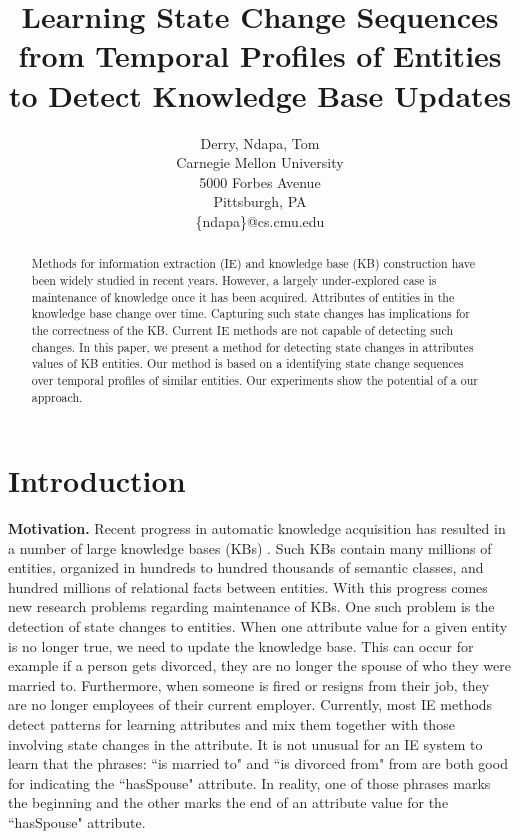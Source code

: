 \documentclass[11pt,a4paper]{article}
\title{Learning State Change Sequences from Temporal Profiles of Entities to Detect Knowledge Base Updates}
\author{Derry, Ndapa, Tom\\
Carnegie Mellon University\\ 5000 Forbes Avenue\\Pittsburgh, PA\\
  { \small
    \{ndapa\}@cs.cmu.edu}
}
\author{
}
\renewcommand{\paragraph}[1]{\noindent\textbf{#1.}}
\begin{document}
\maketitle


\begin{abstract}
 Methods for information extraction (IE) and knowledge base (KB)
construction have been widely studied in recent years.  However, a largely
under-explored case is  maintenance of  knowledge once it has been acquired. 
Attributes of entities in the knowledge base  change over time. Capturing 
such state changes  has implications for 
the correctness of the  KB. Current IE methods are not capable of detecting such changes.
In this paper, we present a method for detecting 
state changes in attributes values of KB entities.
Our method is based on a identifying state change sequences over temporal profiles of similar entities. Our  experiments show the potential of a our approach.

\end{abstract}

\section{Introduction}
\paragraph{Motivation}
Recent progress in automatic knowledge acquisition has resulted in a number of
large knowledge bases (KBs) \cite{Bollacker08,Carlson10,Suchanek07} . Such KBs contain many millions of entities,  organized in hundreds to hundred thousands of semantic classes,  and hundred millions of relational facts between entities. With this progress comes new  research problems regarding maintenance of KBs. One such problem is the detection of state changes to entities. When one attribute value for a given entity is no longer true, we need to update the knowledge base.  This can occur for example if a person  gets divorced,  they are no longer the spouse of who they were married to.  Furthermore, when someone is fired or resigns from their job, they are no longer employees of their current employer. Currently, most IE methods detect patterns for learning attributes and mix them together with those involving state changes in the attribute.  It is not unusual for an IE system to learn that the phrases: ``is married to" and ``is divorced from" from are both good for indicating the ``hasSpouse" attribute. In reality,  one  of those phrases marks the beginning and the other marks the end of an attribute value for the ``hasSpouse" attribute.  
\end{document}
